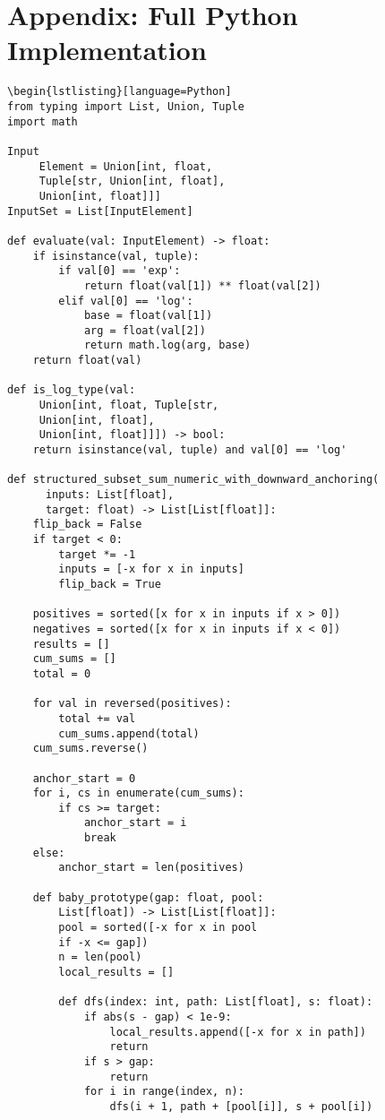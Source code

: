 \documentclass[11pt]{article}
\begin{document}
\section*{Appendix: Full Python Implementation}
\scriptsize
\begin{verbatim}
\begin{lstlisting}[language=Python]
from typing import List, Union, Tuple
import math

Input
     Element = Union[int, float, 
     Tuple[str, Union[int, float],
     Union[int, float]]]
InputSet = List[InputElement]

def evaluate(val: InputElement) -> float:
    if isinstance(val, tuple):
        if val[0] == 'exp':
            return float(val[1]) ** float(val[2])
        elif val[0] == 'log':
            base = float(val[1])
            arg = float(val[2])
            return math.log(arg, base)
    return float(val)

def is_log_type(val:
     Union[int, float, Tuple[str,
     Union[int, float], 
     Union[int, float]]]) -> bool:
    return isinstance(val, tuple) and val[0] == 'log'

def structured_subset_sum_numeric_with_downward_anchoring(
      inputs: List[float],
      target: float) -> List[List[float]]:
    flip_back = False
    if target < 0:
        target *= -1
        inputs = [-x for x in inputs]
        flip_back = True

    positives = sorted([x for x in inputs if x > 0])
    negatives = sorted([x for x in inputs if x < 0])
    results = []
    cum_sums = []
    total = 0

    for val in reversed(positives):
        total += val
        cum_sums.append(total)
    cum_sums.reverse()

    anchor_start = 0
    for i, cs in enumerate(cum_sums):
        if cs >= target:
            anchor_start = i
            break
    else:
        anchor_start = len(positives)

    def baby_prototype(gap: float, pool: 
        List[float]) -> List[List[float]]:
        pool = sorted([-x for x in pool
        if -x <= gap])
        n = len(pool)
        local_results = []

        def dfs(index: int, path: List[float], s: float):
            if abs(s - gap) < 1e-9:
                local_results.append([-x for x in path])
                return
            if s > gap:
                return
            for i in range(index, n):
                dfs(i + 1, path + [pool[i]], s + pool[i])


\end{verbatim}
\end{document}
